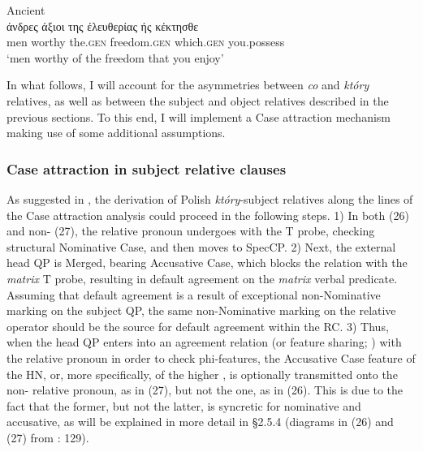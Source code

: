 \documentclass[output=paper]{langsci/langscibook}
\begin{document}
\ea%
    Ancient \label{ex:leska:25}\\
    \gll άνδρες 	άξιοι  	της 	έλευθερίας 	ής 	κέκτησθε\\
             men   worthy   the.\textsc{gen}   freedom.\textsc{gen}   which.\textsc{gen} you.possess  \\
    \glt  ‘men worthy of the freedom that you enjoy’         
\z

In what follows, I will account for the asymmetries between \textit{co} and \textit{który} relatives, as well as between the subject and object relatives described in the previous sections. To this end, I will implement a Case attraction mechanism making use of some additional assumptions.  

\subsubsection{Case attraction in subject relative clauses}%

As suggested in \citet{Łęska2016}, the derivation of Polish \textit{który}{}-subject relatives along the lines of the Case attraction analysis could proceed in the following steps. 1) In both  (26) and non- (27), the relative pronoun undergoes  with the T probe, checking structural Nominative Case, and then moves to SpecCP. 2) Next, the external head QP is Merged, bearing Accusative Case, which blocks the  relation with the \textit{matrix} T probe, resulting in default agreement on the \textit{matrix} verbal predicate. Assuming that default agreement is a result of exceptional non-Nominative marking on the subject QP, the same non-Nominative marking on the relative operator should be the source for default agreement within the RC. 3) Thus, when the head QP enters into an agreement relation (or feature sharing; \citealt{Bader2006}) with the relative pronoun in order to check phi-features, the Accusative Case feature of the HN, or, more specifically, of the higher , is optionally transmitted onto the non- relative pronoun, as in (27), but not the  one, as in (26). This is due to the fact that the former, but not the latter, is syncretic for nominative and accusative, as will be explained in more detail in §2.5.4 (diagrams in (26) and (27) from \citealt{Łęska2016}: 129).
\end{document}
